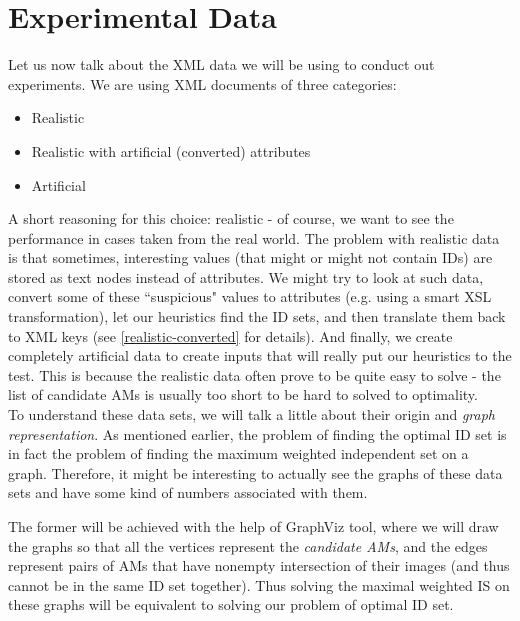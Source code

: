 \section{Experimental Data}

Let us now talk about the XML data we will be using to conduct out experiments. We are using XML documents of three categories:

\begin{itemize}
	\item Realistic
	\item Realistic with artificial (converted) attributes
	\item Artificial
\end{itemize}

A short reasoning for this choice: realistic - of course, we want to see the performance in cases taken from the real world. The problem with realistic data is that sometimes, interesting values (that might or might not contain IDs) are stored as text nodes %
instead of attributes. We might try to look at such data, convert some of these ``suspicious" values to attributes (e.g. using a smart XSL transformation), let our heuristics find the ID sets, and then translate them back to XML keys (see \ref{realistic-converted} for details).
And finally, we create completely artificial data to create inputs that will really put our heuristics to the test. This is because the realistic data often prove to be quite easy to solve - the list of candidate AMs is usually too short to be hard to solved to optimality.\\

To understand these data sets, we will talk a little about their origin and \textit{graph representation}. As mentioned earlier, %
the problem of finding the optimal ID set is in fact the problem of finding the maximum weighted independent set on a graph. Therefore, it might be interesting to actually see the graphs of these data sets and have some kind of numbers associated with them.

The former will be achieved with the help of GraphViz tool, %
where we will draw the graphs so that all the vertices represent the \textit{candidate AMs}, and the edges represent pairs of AMs that have nonempty intersection of their images (and thus cannot be in the same ID set together). Thus solving the maximal weighted IS on these graphs will be equivalent to solving our problem of optimal ID set.

